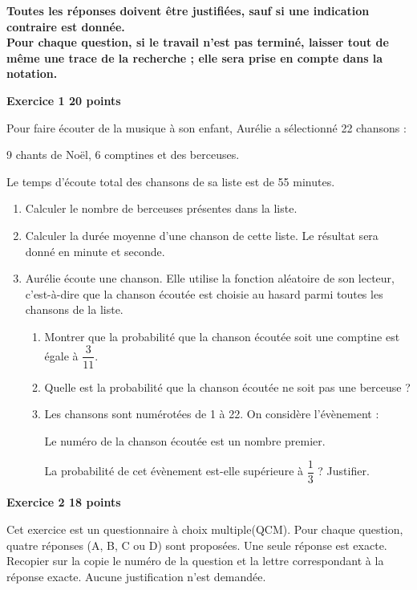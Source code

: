 \documentclass[11pt]{article}
\begin{document}
\textbf{Toutes les réponses doivent être justifiées, sauf si une indication contraire est
donnée.\\
Pour chaque question, si le travail n'est pas terminé, laisser tout de même une
trace de la recherche ; elle sera prise en compte dans la notation.}

\bigskip

\textbf{Exercice 1 \hfill 20 points}

\medskip

Pour faire écouter de la musique à son enfant, Aurélie a sélectionné 22 chansons :

9 chants de Noël, 6 comptines et des berceuses.

Le temps d'écoute total des chansons de sa liste est de 55 minutes.

\medskip

\begin{enumerate}
\item Calculer le nombre de berceuses présentes dans la liste.
\item Calculer la durée moyenne d'une chanson de cette liste. Le résultat sera donné en
minute et seconde.
\item Aurélie écoute une chanson. Elle utilise la fonction aléatoire de son lecteur, c'est-à-dire que la chanson écoutée est choisie au hasard parmi toutes les chansons de la liste.
	\begin{enumerate}
		\item Montrer que la probabilité que la chanson écoutée soit une comptine est égale à $\dfrac{3}{11}$.
		\item Quelle est la probabilité que la chanson écoutée ne soit pas une berceuse ?
		\item Les chansons sont numérotées de 1 à 22. On considère l'évènement :
		
\begin{center}\og Le numéro de la chanson écoutée est un nombre premier. \fg\end{center}
La probabilité de cet évènement est-elle supérieure à
$\dfrac13$ ? Justifier.
	\end{enumerate}
\end{enumerate}

\bigskip

\textbf{Exercice 2 \hfill 18 points}

\medskip

Cet exercice est un questionnaire à choix multiple(QCM). Pour chaque question, quatre
réponses (A, B, C ou D) sont proposées. Une seule réponse est exacte. Recopier sur la copie le numéro de la question et la lettre correspondant à la réponse exacte. Aucune justification n'est demandée.
\end{document}
